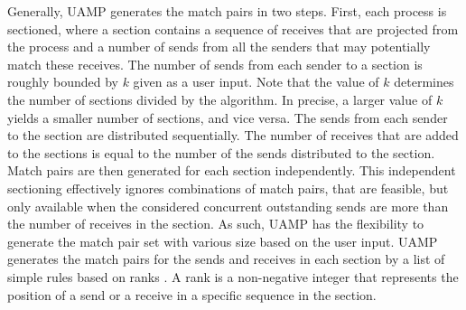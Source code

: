 Generally, UAMP generates the match pairs in two steps. 
First, each process is sectioned, where a section contains a sequence of receives that are projected from the process and a number of sends from all the senders that may potentially match these receives. 
The number of sends from each sender to a section is roughly bounded by $k$ given as a user input. Note that the value of $k$ determines the number of sections divided by the algorithm. In precise, a larger value of $k$ yields a smaller number of sections, and vice versa. The sends from each sender to the section are distributed sequentially.  
The number of receives that are added to the sections is equal to the number of the sends distributed to the section. %
Match pairs are then generated for each section independently. 
This independent sectioning effectively ignores combinations of match pairs, that are feasible, but only available when the considered concurrent outstanding sends are more than the number of receives in the section. As such, UAMP has the flexibility to generate the match pair set with various size based on the user input.
UAMP generates the match pairs for the sends and receives in each section by a list of simple rules based on ranks \cite{DBLP:conf/kbse/HuangMM13}. A rank is a non-negative integer that represents the position of a send or a receive in a specific sequence in the section.


